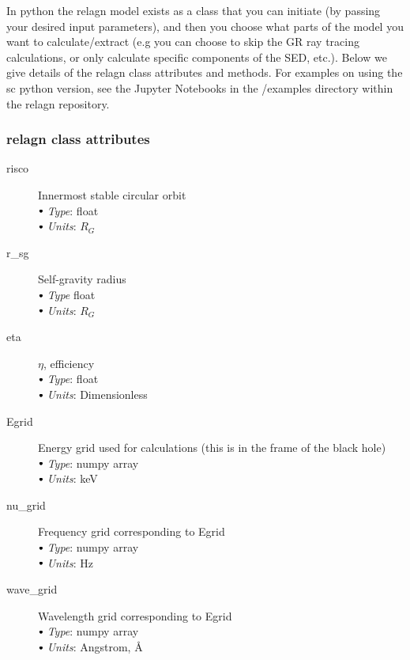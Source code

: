 \documentclass[a4paper, 11pt, times, onecolumn]{article}
\newcommand{\sbt}{\,\begin{picture}(-1,1)(-1,-3)\circle*{3}\end{picture}\ }
\begin{document}
In {\sc python} the {\sc relagn} model exists as a class that you can initiate (by passing your desired input parameters), and then you choose what parts of the model you want to calculate/extract (e.g you can choose to skip the GR ray tracing calculations, or only calculate specific components of the SED, etc.). Below we give details of the {\sc relagn} class attributes and methods. For examples on using the {sc python} version, see the Jupyter Notebooks in the /examples directory within the {\sc relagn} repository.



\subsubsection{{\sc relagn} class attributes}

\begin{description}

	\item[risco] Innermost stable circular orbit \\
		$\sbt$ {\it Type}: float \\
		$\sbt$ {\it Units}: $R_{G}$
	
	\item[r\_sg] Self-gravity radius \\
		$\sbt$ {\it Type} float \\
		$\sbt$ {\it Units}: $R_{G}$
	
	\item[eta] $\eta$, efficiency \\
		$\sbt$ {\it Type}: float \\
		$\sbt$ {\it Units}: Dimensionless 
	
	\item[Egrid] Energy grid used for calculations (this is in the frame of the black hole) \\
		$\sbt$ {\it Type}: numpy array \\
		$\sbt$ {\it Units}: keV 
	
	\item[nu\_grid] Frequency grid corresponding to Egrid \\
		$\sbt$ {\it Type}: numpy array \\
		$\sbt$ {\it Units}: Hz
	
	\item[wave\_grid] Wavelength grid corresponding to Egrid \\
		$\sbt$ {\it Type}: numpy array \\
		$\sbt$ {\it Units}: Angstrom, \AA
	

\end{description}
\end{document}
